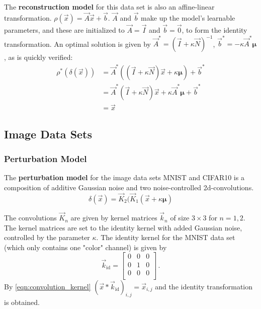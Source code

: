 The \textbf{reconstruction model} for this data set is also an affine-linear transformation. 
$\rho(\vec x) = \vec A \vec x + \vec b$.
$\vec A$ and $\vec b$ make up the model's learnable parameters, and
these are initialized to $\vec A = \vec I$ and $\vec b = \vec 0$, to form the identity transformation.
An optimal solution is given by
$\vec A^* = (\vec I + \kappa \vec N)^{-1}$, $\vec b^* = -\kappa \vec A^* \boldsymbol \mu$,
as is quickly verified:
\begin{equation}
\label{eqn:gmm_optimal}
\begin{split}
    \rho^* ( \delta (\vec x)) 
    &= \vec A^* ((\vec I + \kappa \vec N)\vec x + \kappa \boldsymbol \mu) + \vec b^* \\
    &= \vec A^* (\vec I + \kappa \vec N)\vec x + \kappa \vec A^* \boldsymbol \mu + \vec b^* \\
    &= \vec x
\end{split}
\end{equation}

\subsection{Image Data Sets}

\subsubsection{Perturbation Model}

The \textbf{perturbation model} for the image data sets MNIST and CIFAR10
is a composition of additive Gaussian noise and two noise-controlled 2d-convolutions.
\[
    \delta(\vec x) = \vec K_2(\vec K_1(\vec x + \kappa \boldsymbol \mu)
\]

The convolutions $\vec K_n$ are given by kernel matrices $\vec k_n$ of size $3\times3$ for $n=1,2$.
The kernel matrices are set to the identity kernel with added Gaussian noise, 
controlled by the parameter $\kappa$.
The identity kernel for the MNIST data set (which only contains one "color" channel) is given by 
\begin{equation*}
    \vec k_{\text{id}} = \begin{bmatrix}
        0 & 0 & 0 \\
        0 & 1 & 0 \\
        0 & 0 & 0 \\
    \end{bmatrix} \,.
\end{equation*}
%
By \cref{eqn:convolution_kernel} 
$(\vec x * \vec k_\text{id})_{i,j} = \vec x_{i, j}$
and the identity transformation is obtained.

